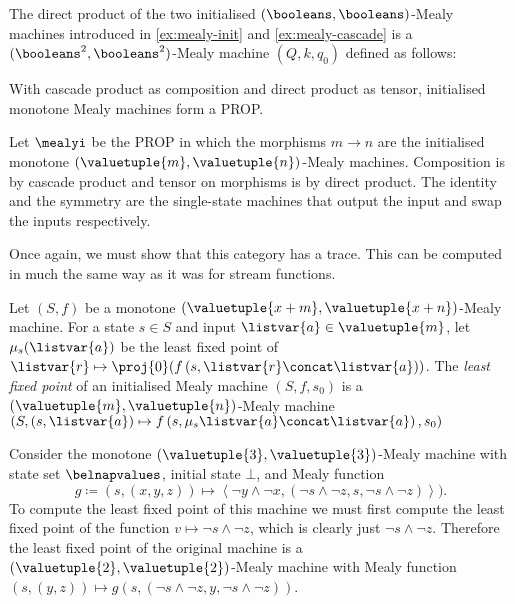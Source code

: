 \documentclass{lmcs}
\begin{document}
\begin{exa}\label{ex:mealy-direct}
    The direct product of the two initialised \((\booleans,\booleans)\)-Mealy
    machines introduced in \autoref{ex:mealy-init} and \autoref{ex:mealy-cascade} is
    a \((\booleans^2,\booleans^2)\)-Mealy machine \((Q,k,q_0)\) defined as
    follows:
    \begin{center}
        
    \end{center}
\end{exa}

With cascade product as composition and direct product as tensor, initialised
monotone Mealy machines form a PROP.

\begin{defi}
    Let \(\mealyi\) be the PROP in which the morphisms
    \(m \to n\) are the initialised monotone
    \((\valuetuple{m}, \valuetuple{n})\)-Mealy machines.
    Composition is by cascade product and tensor on morphisms is by
    direct product.
    The identity and the symmetry are the single-state machines that output the
    input and swap the inputs respectively.
\end{defi}

Once again, we must show that this category has a trace.
This can be computed in much the same way as it was for stream functions.

\begin{defi}
    Let \((S, f)\) be a monotone \(
    (\valuetuple{x+m}, \valuetuple{x+n})
    \)-Mealy machine.
    For a state \(s \in S\) and input \(\listvar{a} \in \valuetuple{m}\), let
    \(\mu_{s}(\listvar{a})\) be the least fixed point of \(
    \listvar{r} \mapsto \proj{0}\mleft(f\left(s, \listvar{r} \concat \listvar{a}\right)\mright)
    \).
    The \emph{least fixed point} of an initialised Mealy machine \((S, f, s_0)\)
    is a \((\valuetuple{m}, \valuetuple{n})\)-Mealy machine \(\left(
    S, (s, \listvar{a})
    \mapsto
    f\left(s, \mu_{s}\listvar{a} \concat \listvar{a}\right), s_0
    \right)
    \)
\end{defi}

\begin{exa}\label{ex:trace-mealy}
    Consider the monotone \((\valuetuple{3},\valuetuple{3})\)-Mealy machine with
    state set \(\belnapvalues\), initial state \(\bot\), and Mealy function \[
        g \coloneqq (s, (x, y, z))
        \mapsto \left\langle \neg y \land \neg x,
        \left(\neg s \land \neg z, s, \neg s \land \neg z\right)
        \right\rangle
        ).\]
    To compute the least fixed point of this machine we must first compute the
    least fixed point of the function \(v \mapsto \neg s \land \neg z\), which
    is clearly just \(\neg s \land \neg z\).
    Therefore the least fixed point of the original machine is a
    \((\valuetuple{2}, \valuetuple{2})\)-Mealy machine with Mealy function \(
    (s, (y, z)) \mapsto g(s, (\neg s \land \neg z, y, \neg s \land \neg z))
    \).
\end{exa}
\end{document}
